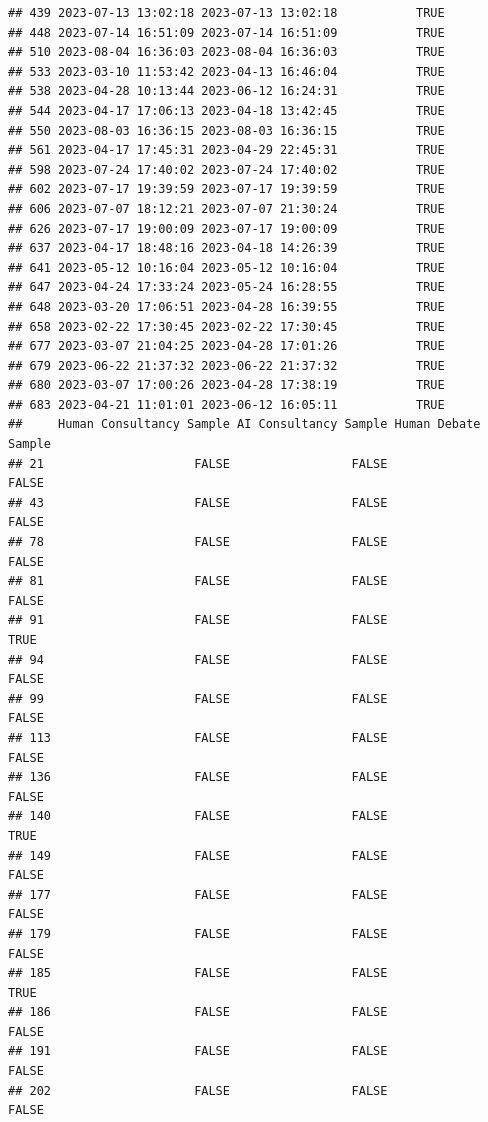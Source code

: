 \documentclass[
]{article}
\begin{document}
\begin{verbatim}
## 439 2023-07-13 13:02:18 2023-07-13 13:02:18           TRUE
## 448 2023-07-14 16:51:09 2023-07-14 16:51:09           TRUE
## 510 2023-08-04 16:36:03 2023-08-04 16:36:03           TRUE
## 533 2023-03-10 11:53:42 2023-04-13 16:46:04           TRUE
## 538 2023-04-28 10:13:44 2023-06-12 16:24:31           TRUE
## 544 2023-04-17 17:06:13 2023-04-18 13:42:45           TRUE
## 550 2023-08-03 16:36:15 2023-08-03 16:36:15           TRUE
## 561 2023-04-17 17:45:31 2023-04-29 22:45:31           TRUE
## 598 2023-07-24 17:40:02 2023-07-24 17:40:02           TRUE
## 602 2023-07-17 19:39:59 2023-07-17 19:39:59           TRUE
## 606 2023-07-07 18:12:21 2023-07-07 21:30:24           TRUE
## 626 2023-07-17 19:00:09 2023-07-17 19:00:09           TRUE
## 637 2023-04-17 18:48:16 2023-04-18 14:26:39           TRUE
## 641 2023-05-12 10:16:04 2023-05-12 10:16:04           TRUE
## 647 2023-04-24 17:33:24 2023-05-24 16:28:55           TRUE
## 648 2023-03-20 17:06:51 2023-04-28 16:39:55           TRUE
## 658 2023-02-22 17:30:45 2023-02-22 17:30:45           TRUE
## 677 2023-03-07 21:04:25 2023-04-28 17:01:26           TRUE
## 679 2023-06-22 21:37:32 2023-06-22 21:37:32           TRUE
## 680 2023-03-07 17:00:26 2023-04-28 17:38:19           TRUE
## 683 2023-04-21 11:01:01 2023-06-12 16:05:11           TRUE
##     Human Consultancy Sample AI Consultancy Sample Human Debate Sample
## 21                     FALSE                 FALSE               FALSE
## 43                     FALSE                 FALSE               FALSE
## 78                     FALSE                 FALSE               FALSE
## 81                     FALSE                 FALSE               FALSE
## 91                     FALSE                 FALSE                TRUE
## 94                     FALSE                 FALSE               FALSE
## 99                     FALSE                 FALSE               FALSE
## 113                    FALSE                 FALSE               FALSE
## 136                    FALSE                 FALSE               FALSE
## 140                    FALSE                 FALSE                TRUE
## 149                    FALSE                 FALSE               FALSE
## 177                    FALSE                 FALSE               FALSE
## 179                    FALSE                 FALSE               FALSE
## 185                    FALSE                 FALSE                TRUE
## 186                    FALSE                 FALSE               FALSE
## 191                    FALSE                 FALSE               FALSE
## 202                    FALSE                 FALSE               FALSE

\end{verbatim}
\end{document}
